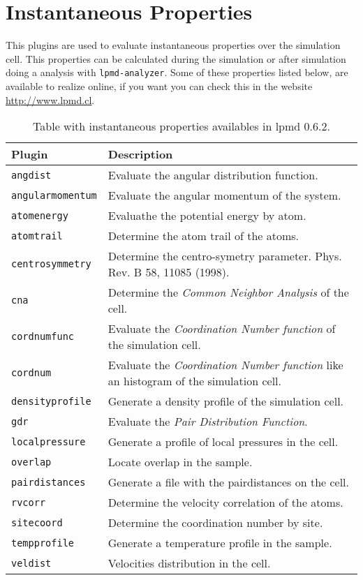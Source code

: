 \section{Instantaneous Properties}
This plugins are used to evaluate instantaneous properties over the simulation
cell. This properties can be calculated during the simulation or after
simulation doing a analysis with \texttt{lpmd-analyzer}. Some of these
properties listed below, are available to realize online, if you want you can
check this in the website \url{http://www.lpmd.cl}.

\begin{table}[h!]\centering
 \begin{tabular}{|l|p{13cm}|}\hline
 Plugin & Description \\
 \hline
 \texttt{angdist} & Evaluate the angular distribution function.\\
 \hline
 \texttt{angularmomentum} & Evaluate the angular momentum of the system.\\
 \hline
 \texttt{atomenergy} & Evaluathe the potential energy by atom.\\
 \hline
 \texttt{atomtrail} & Determine the atom trail of the atoms.\\
 \hline
 \texttt{centrosymmetry} & Determine the centro-symetry parameter. Phys. Rev. B
 58, 11085 (1998).\\
 \texttt{cna} & Determine the \textit{Common Neighbor Analysis} of the cell.\\
 \hline
 \texttt{cordnumfunc} & Evaluate the \textit{Coordination Number function} of
 the simulation cell.\\
 \hline
 \texttt{cordnum} & Evaluate the \textit{Coordination Number function} like an
 histogram of the simulation cell.\\
 \hline
 \texttt{densityprofile} & Generate a density profile of the simulation cell.\\
 \hline
 \texttt{gdr} & Evaluate the \textit{Pair Distribution Function}.\\
 \hline
 \texttt{localpressure} & Generate a profile of local pressures in the cell.\\
 \hline
 \texttt{overlap} & Locate overlap in the sample.\\
 \hline
 \texttt{pairdistances} & Generate a file with the pairdistances on the cell.\\
 \hline
 \texttt{rvcorr} & Determine the velocity correlation of the atoms.\\
 \hline
 \texttt{sitecoord} & Determine the coordination number by site.\\
 \hline
 \texttt{tempprofile} & Generate a temperature profile in the sample.\\
 \hline
 \texttt{veldist} & Velocities distribution in the cell.\\
 \hline
 \end{tabular}
\label{tab:modproper}
\caption{Table with instantaneous properties availables in lpmd 0.6.2.}
\end{table}

